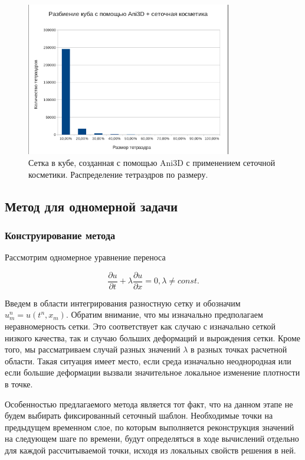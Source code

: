\begin{figure}[htp]
\centering
\includegraphics[width=0.8\textwidth]{png/ani3d-improved-stats.png}
\caption{Сетка в кубе, созданная с помощью Ani3D с применением сеточной косметики. Распределение тетраэдров по размеру.}
\end{figure}

\clearpage
\newpage

\subsection{Метод для одномерной задачи}

\subsubsection{Конструирование метода}

Рассмотрим одномерное уравнение переноса

\begin{equation}
\frac{\partial{u}}{\partial{t}} + \lambda \frac{\partial{u}}{\partial{x}} = 0, \lambda \ne const.
\end{equation}

Введем в области интегрирования разностную сетку и обозначим $u_m^n = u(t^n, x_m)$. Обратим внимание, что мы изначально предполагаем неравномерность сетки. Это соответствует как случаю с изначально сеткой низкого качества, так и случаю больших деформаций и вырождения сетки. Кроме того, мы рассматриваем случай разных значений $\lambda$ в разных точках расчетной области. Такая ситуация имеет место, если среда изначально неоднородная или если большие деформации вызвали значительное локальное изменение плотности в точке.

Особенностью предлагаемого метода является тот факт, что на данном этапе не будем выбирать фиксированный сеточный шаблон. Необходимые точки на предыдущем временном слое, по которым выполняется реконструкция значений на следующем шаге по времени, будут определяться в ходе вычислений отдельно для каждой рассчитываемой точки, исходя из локальных свойств решения в ней.

